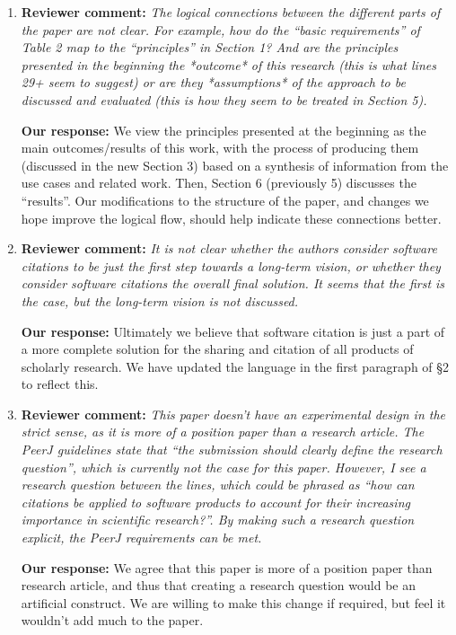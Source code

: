 \documentclass{article}
\begin{document}
\begin{enumerate}
\item \textbf{Reviewer comment:}
\emph{The logical connections between the different parts of the paper are not clear. For example, how do the ``basic requirements'' of Table 2 map to the ``principles'' in Section 1? And are the principles presented in the beginning the *outcome* of this research (this is what lines 29+ seem to suggest) or are they *assumptions* of the approach to be discussed and evaluated (this is how they seem to be treated in Section 5).}

\textbf{Our response:}
We view the principles presented at the beginning as the main outcomes\slash results of this work, with the process of producing them (discussed in the new Section 3) based on a synthesis of information from the use cases and related work. Then, Section 6 (previously 5) discusses the ``results''.
Our modifications to the structure of the paper, and changes we hope improve the logical flow, should help indicate these connections better.

\item \textbf{Reviewer comment:}
\emph{It is not clear whether the authors consider software citations to be just the first step towards a long-term vision, or whether they consider software citations the overall final solution. It seems that the first is the case, but the long-term vision is not discussed.}

\textbf{Our response:}
Ultimately we believe that software citation is just a part of a more complete
solution for the sharing and citation of all products of scholarly research.
We have updated the language in the first paragraph of \S 2 to reflect this.

\item \textbf{Reviewer comment:}
\emph{This paper doesn't have an experimental design in the strict sense, as it is more of a position paper than a research article. The PeerJ guidelines state that ``the submission should clearly define the research question'', which is currently not the case for this paper. However, I see a research question between the lines, which could be phrased as ``how can citations be applied to software products to account for their increasing importance in scientific research?''. By making such a research question explicit, the PeerJ requirements can be met.}

\textbf{Our response:}
We agree that this paper is more of a position paper than research article, and thus that creating a research question would be an artificial construct. We are willing to make this change if required, but feel it wouldn't add much to the paper.


\end{enumerate}
\end{document}
